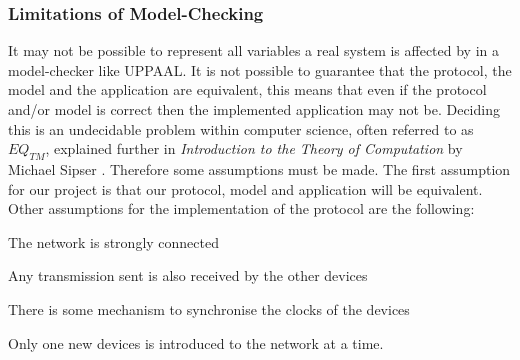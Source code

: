 \subsubsection{Limitations of Model-Checking}

It may not be possible to represent all variables a real system is affected by in a model-checker like UPPAAL.
It is not possible to guarantee that the protocol, the model and the application are equivalent, this means that even if the protocol and/or model is correct then the implemented application may not be. 
Deciding this is an undecidable problem within computer science, often referred to as $EQ_{TM}$, explained further in \textit{Introduction to the Theory of Computation} by Michael Sipser \citep[p. 220]{Sipser}.
Therefore some assumptions must be made. 
The first assumption for our project is that our protocol, model and application will be equivalent.
Other assumptions for the implementation of the protocol are the following: 
\begin{eletterate}
    \item The network is strongly connected
    \item Any transmission sent is also received by the other devices
    \item There is some mechanism to synchronise the clocks of the devices
    \item Only one new devices is introduced to the network at a time.
\end{eletterate}
